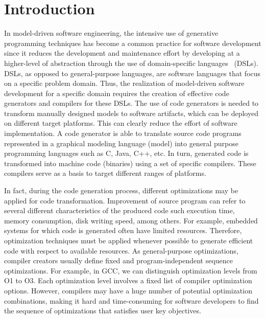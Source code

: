 \section{Introduction}
In model-driven software engineering, the intensive use of generative programming techniques has become a common practice for software development since it reduces the development and maintenance effort by developing at a higher-level of abstraction through the use of domain-specific languages~\cite{brambilla2012model} (DSLs). 
DSLs, as opposed to general-purpose languages, are software languages that focus on a specific problem domain. Thus, the realization of model-driven software development for a specific domain requires the creation of effective code generators and compilers for these DSLs.
The use of code generators is needed to transform manually designed models to software artifacts, which can be deployed on different target platforms. This can clearly reduce the effort of software implementation. A code generator is able to translate source code programs represented in a graphical modeling language (model) into general purpose programming languages such as C, Java, C++, etc. In turn, generated code is transformed into machine code (binaries) using a set of specific compilers.
These compilers serve as a basis to target different ranges of platforms. 

In fact, during the code generation process, different optimizations may be applied for code transformation. Improvement of source program can refer to several different characteristics of the produced code such execution time, memory consumption, disk writing speed, among others.
For example, embedded systems for which code is generated often have limited resources. 
Therefore, optimization techniques must be applied whenever possible to generate efficient code with respect to available resources. 
As general-purpose optimizations, compiler creators usually
define fixed and program-independent sequence optimizations.
For example, in GCC, we can distinguish optimization levels
from O1 to O3. Each optimization level involves a fixed list of compiler optimization options. 
However, compilers may have a huge number of potential optimization combinations, making it hard and time-consuming for software developers to find the sequence of optimizations that satisfies user key objectives. 

